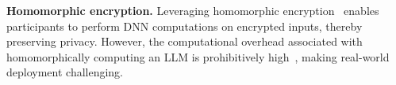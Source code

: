


\noindent
\textbf{Homomorphic encryption.} Leveraging homomorphic encryption~\cite{HE} enables participants to perform DNN computations on encrypted inputs, thereby preserving privacy. However, the computational overhead associated with homomorphically computing an LLM is prohibitively high~\cite{chen-etal-2022-x}, making real-world deployment challenging.






